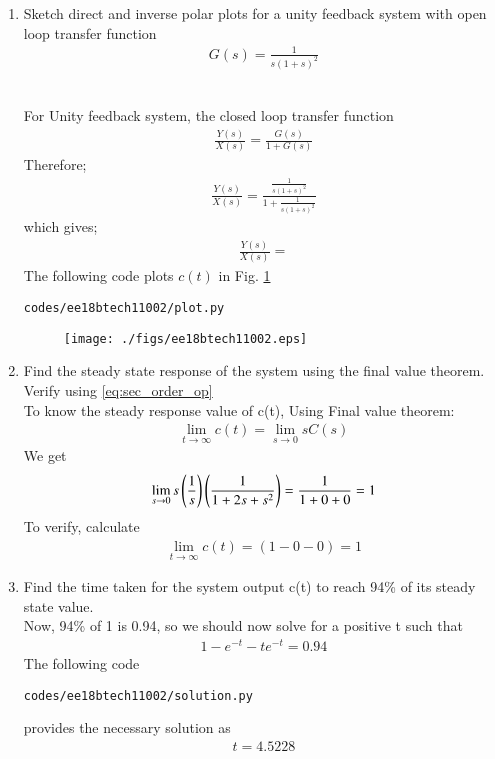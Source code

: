 \begin{enumerate}[label=\thesection.\arabic*.,ref=\thesection.\theenumi]
\item
Sketch direct and inverse polar plots for a unity feedback system with open loop transfer function
\begin{align}
G(s) = \frac{1}{s(1+s)^2}
\end{align}
 
\\
\solution  
For Unity feedback system, the closed loop transfer function
\begin{align}
\frac{Y(s)}{X(s)} = \frac{G(s)}{1+G(s)}
\end{align}
Therefore;
\begin{align}
\frac{Y(s)}{X(s)} = \frac{\frac{1}{s(1+s)^2}}{1+\frac{1}{s(1+s)^2}}
\end{align}
which gives;
\begin{align}
\frac{Y(s)}{X(s)} = 
\label{eq:sec_order_op}
\end{align}
%
The following code plots $c(t)$ in Fig. \ref{fig:sec_order}
\begin{lstlisting}
codes/ee18btech11002/plot.py
\end{lstlisting}
\begin{figure}
\centering
\texttt{[image: ./figs/ee18btech11002.eps]}
\caption{}
\label{fig:sec_order}
\end{figure}
\item Find the steady state response of the system using the final value theorem.  Verify using 
\ref{eq:sec_order_op}
\\
\solution 
To know the steady response value of c(t), Using Final value theorem:
\begin{align}
\lim_{t\to\infty} c(t) = \lim_{s\to 0} sC(s) 
\end{align}
We get
\begin{align}
\lim_{s\to 0} s \left(\frac{1}{s}\right)\left(\frac{1}{1+2s+s^2}\right) = \frac{1}{1+0+0} = 1
\end{align}
To verify, calculate
\begin{align}
\lim_{t\to\infty} c(t) = (1-0-0) = 1 
\end{align}
\item Find the time taken for the system output c(t) to reach 94\% of its steady state value.
\\
\solution 
Now, 94\% of 1 is 0.94, so we should now solve for a positive t such that
\begin{align}
1 - e^{-t} - te^{-t} = 0.94
\end{align}
The following code 
%
\begin{lstlisting}
codes/ee18btech11002/solution.py
\end{lstlisting}
%
provides the necessary solution as 
\begin{align}
 t = 4.5228
\end{align}

\end{enumerate}
